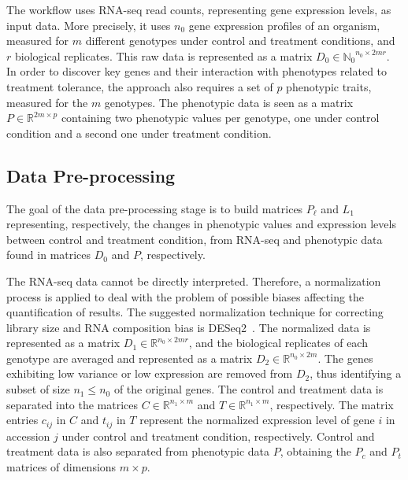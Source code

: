 \documentclass{bmcart}
\begin{document}
The workflow uses RNA-seq read counts, representing gene expression
levels, as input data. More precisely, it uses $n_0$ gene expression
profiles of an organism, measured for $m$ different genotypes under
control and treatment conditions, and $r$ biological replicates. This
raw data is represented as a matrix $D_0 \in {\mathbb{N}_0}^{n_0
  \times 2mr}$. In order to discover key genes and their interaction
with phenotypes related to treatment tolerance, the approach also
requires a set of $p$ phenotypic traits, measured for the $m$
genotypes. The phenotypic data is seen as a matrix $P \in
\mathbb{R}^{2m \times p}$ containing two phenotypic values per
genotype, one under control condition and a second one under treatment
condition.

\subsection*{Data Pre-processing}

The goal of the data pre-processing stage is to build matrices
$P_\ell$ and $L_1$ representing, respectively, the changes in
phenotypic values and expression levels between control and treatment
condition, from RNA-seq and phenotypic data found in matrices $D_0$
and $P$, respectively.
\vspace{0.5cm}

The RNA-seq data cannot be directly interpreted. Therefore, a
normalization process is applied to deal with the problem of possible
biases affecting the quantification of results. The suggested
normalization technique for correcting library size and RNA
composition bias is DESeq2~\cite{love2014moderated}. The normalized
data is represented as a matrix $D_1 \in \mathbb{R}^{n_0 \times 2mr}$,
and the biological replicates of each genotype are averaged and
represented as a matrix $D_2 \in \mathbb{R}^{n_0 \times 2m}$. The
genes exhibiting low variance or low expression are removed from
$D_2$, thus identifying a subset of size $n_1 \leq n_0$ of the
original genes. The control and treatment data is separated into the
matrices $C\in \mathbb{R}^{n_1 \times m}$ and $T\in \mathbb{R}^{n_1
  \times m}$, respectively. The matrix entries $c_{ij}$ in $C$ and
$t_{ij}$ in $T$ represent the normalized expression
level of gene $i$ in accession $j$ under control and treatment 
condition, respectively.
Control and treatment data is also separated from
phenotypic data $P$, obtaining the $P_c$ and $P_t$ matrices of
dimensions $m \times p$.
\vspace{0.5cm}
\end{document}
